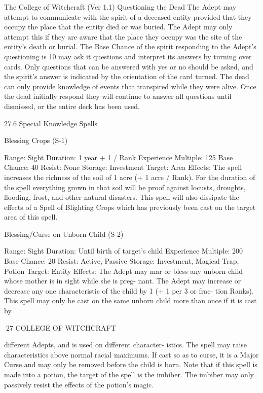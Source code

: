 \begin{Chapter}{The College of Witchcraft (Ver 1.1)}
Questioning  the  Dead  The  Adept  may  attempt  to 
communicate  with  the  spirit  of  a  deceased  entity 
provided that they occupy the place that the entity 
died  or  was  buried.  The  Adept  may  only  attempt 
this  if  they  are  aware  that  the  place  they  occupy 
was  the  site  of  the  entity’s  death  or  burial.  The 
Base Chance of the spirit responding to the Adept’s 
questioning is 10%
may  ask  it  questions  and  interpret  its  answers  by 
turning  over  cards.  Only  questions  that  can  be 
answered  with  yes  or  no  should  be  asked,  and  the 
spirit’s answer is indicated by the orientation of the 
card turned. The dead can only provide knowledge 
of  events  that  transpired  while  they  were  alive. 
Once  the  dead  initially  respond  they  will  continue 
to  answer  all  questions  until  dismissed,  or  the 
entire deck has been used. 

27.6 Special Knowledge Spells 

Blessing Crops (S-1) 

Range: Sight 
Duration: 1 year + 1 / Rank 
Experience Multiple: 125 
Base Chance: 40%
Resist: None 
Storage: Investment 
Target: Area 
Effects: The spell increases the richness of the soil 
of 1 acre (+ 1 acre / Rank). For the duration of the 
spell  everything  grown  in  that  soil  will  be  proof 
against locusts, droughts, flooding, frost, and other 
natural  disasters.  This  spell  will  also  dissipate  the 
effects  of  a  Spell  of  Blighting  Crops  which  has 
previously been cast on the target area of this spell. 

Blessing/Curse on Unborn Child (S-2) 

Range: Sight 
Duration: Until birth of target’s child 
Experience Multiple: 200 
Base Chance: 20%
Resist: Active, Passive 
Storage: Investment, Magical Trap, Potion 
Target: Entity 
Effects:  The  Adept  may  mar  or  bless  any  unborn 
child  whose  mother  is  in  sight  while  she  is  preg-
nant. The Adept may increase or decrease any one 
characteristic  of  the  child  by  1  (+  1  per  3  or  frac-
tion  Ranks).  This  spell  may  only  be  cast  on  the 
same  unborn  child  more  than  once  if  it  is  cast  by 

27 COLLEGE OF WITCHCRAFT 

different Adepts, and is used on different character-
istics.  The  spell  may  raise  characteristics  above 
normal racial maximums. If cast so as to curse, it is 
a Major Curse and may only be removed before the 
child is born. Note that if this spell is made into a 
potion,  the  target  of  the  spell  is  the  imbiber.  The 
imbiber may only passively resist the effects of the 
potion’s magic. 


\end{Chapter}
